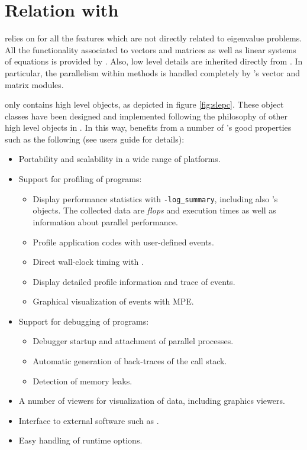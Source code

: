 \chapter{\label{cap:petsc}Relation with \petsc}

\noindent \slepc relies on \petsc{} for all the features which are not directly related to eigenvalue problems. All the functionality associated to vectors and matrices as well as linear systems of equations is provided by \petsc. Also, low level details are inherited directly from \petsc. In particular, the parallelism within \slepc methods is handled completely by \petsc's vector and matrix modules. 

	\slepc only contains high level objects, as depicted in figure \ref{fig:slepc}. These object classes have been designed and implemented following the philosophy of other high level objects in \petsc. In this way, \slepc benefits from a number of \petsc's good properties such as the following (see \petsc{} users guide for details):
\begin{itemize}
\item Portability and scalability in a wide range of platforms.
\item Support for profiling of programs:
  \begin{itemize}
  \item Display performance statistics with \Verb!-log_summary!, including also \slepc's objects. The collected data are \emph{flops} and execution times as well as information about parallel performance.
  \item Profile application codes with user-defined events.
  \item Direct wall-clock timing with .
  \item Display detailed profile information and trace of events.
  \item Graphical visualization of events with MPE.
  \end{itemize}
\item Support for debugging of programs:
  \begin{itemize}
  \item Debugger startup and attachment of parallel processes.
  \item Automatic generation of back-traces of the call stack.
  \item Detection of memory leaks.
  \end{itemize}
\item A number of viewers for visualization of data, including graphics viewers.
\item Interface to external software such as \matlab.
\item Easy handling of runtime options.
\end{itemize}

